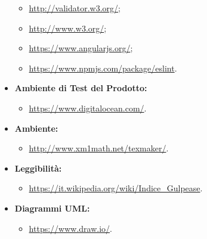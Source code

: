 \begin{itemize}
\begin{itemize}
	\item \url{http://validator.w3.org/};
	\item \url{http://www.w3.org/};
	\item \url{https://www.angularjs.org/};
	\item \url{https://www.npmjs.com/package/eslint}.
	\end{itemize}
\item \textbf{Ambiente di Test del Prodotto:}
	\begin{itemize}
		\item \url{https://www.digitalocean.com/}.
	\end{itemize}
\item \textbf{Ambiente:}
	\begin{itemize}
		\item \url{http://www.xm1math.net/texmaker/}.
	\end{itemize}
\item \textbf{Leggibilità:}
	\begin{itemize}
		\item \url{https://it.wikipedia.org/wiki/Indice\_Gulpease}.
	\end{itemize}
\item \textbf{Diagrammi UML:}
\begin{itemize}
	\item \url{https://www.draw.io/}.
\end{itemize}

\end{itemize}

